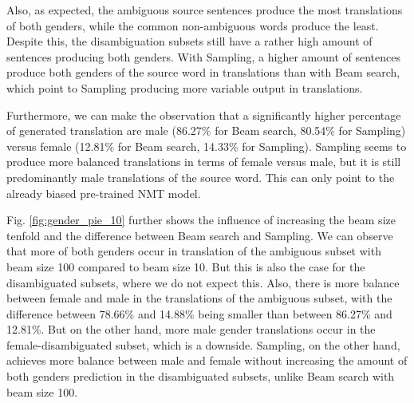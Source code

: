 Also, as expected, the ambiguous source sentences produce the most translations of both genders, while the common non-ambiguous words produce the least. Despite this, the disambiguation subsets still have a rather high amount of sentences producing both genders. With Sampling, a higher amount of sentences produce both genders of the source word in translations than with Beam search, which point to Sampling producing more variable output in translations.

Furthermore, we can make the observation that a significantly higher percentage of generated translation are male (86.27\% for Beam search, 80.54\% for Sampling) versus female (12.81\% for Beam search, 14.33\% for Sampling). Sampling seems to produce more balanced translations in terms of female versus male, but it is still predominantly male translations of the source word. This can only point to the already biased pre-trained NMT model. 

Fig. \ref{fig:gender_pie_10} further shows the influence of increasing the beam size tenfold and the difference between Beam search and Sampling. We can observe that more of both genders occur in translation of the ambiguous subset with beam size 100 compared to beam size 10. But this is also the case for the disambiguated subsets, where we do not expect this. Also, there is more balance between female and male in the translations of the ambiguous subset, with the difference between 78.66\% and 14.88\% being smaller than between 86.27\% and 12.81\%. But on the other hand, more male gender translations occur in the female-disambiguated subset, which is a downside. Sampling, on the other hand, achieves more balance between male and female without increasing the amount of both genders prediction in the disambiguated subsets, unlike Beam search with beam size 100.

